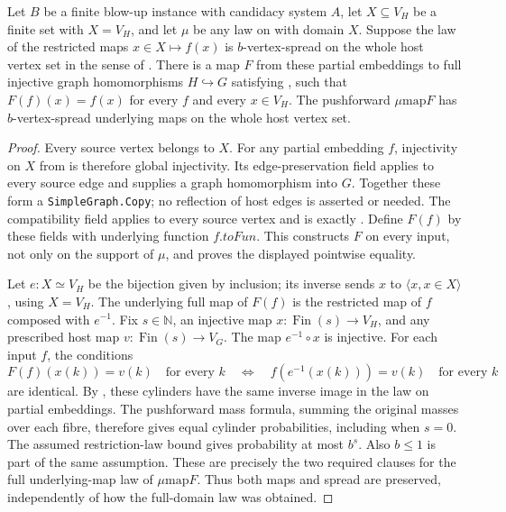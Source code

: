 \begin{lemma}
Let $B$ be a finite blow-up instance with candidacy system $A$, let
$X\subseteq V_H$ be a finite set with $X=V_H$, and let $\mu$ be any law on
 with domain $X$. Suppose the law of
the restricted maps $x\in X\mapsto f(x)$ is $b$-vertex-spread on the whole
host vertex set in the sense of .
There is a map $F$ from these partial embeddings to full injective graph
homomorphisms $H\hookrightarrow G$ satisfying ,
such that $F(f)(x)=f(x)$ for every $f$ and every $x\in V_H$.
The pushforward $\mu\mathbin{\mathrm{map}}F$ has $b$-vertex-spread
underlying maps on the whole host vertex set.
\end{lemma}
\begin{proof}
Every source vertex belongs to $X$. For any partial embedding $f$,
injectivity on $X$ from  is therefore
global injectivity. Its edge-preservation field applies to every source
edge and supplies a graph homomorphism into $G$. Together these form a
\texttt{SimpleGraph.Copy}; no reflection of host edges is asserted or
needed. The compatibility field applies to every source vertex and is
exactly . Define $F(f)$ by these fields
with underlying function $f.toFun$. This constructs $F$ on every input,
not only on the support of $\mu$, and proves the displayed pointwise equality.

Let $e:X\simeq V_H$ be the bijection given by inclusion; its inverse
sends $x$ to $\langle x,x\in X\rangle$, using $X=V_H$.
The underlying full map of $F(f)$ is the restricted map of $f$ composed
with $e^{-1}$. Fix $s\in\mathbb N$, an injective map
$x:\operatorname{Fin}(s)\to V_H$, and any prescribed host map
$v:\operatorname{Fin}(s)\to V_G$. The map $e^{-1}\circ x$ is injective.
For each input $f$, the conditions
\[
 F(f)(x(k))=v(k)\quad\text{for every }k
 \quad\Longleftrightarrow\quad
 f(e^{-1}(x(k)))=v(k)\quad\text{for every }k
\]
are identical. By , these cylinders have the
same inverse image in the law on partial embeddings. The pushforward
mass formula, summing the original masses over each fibre, therefore
gives equal cylinder probabilities, including when $s=0$.
The assumed restriction-law bound gives probability at most $b^s$.
Also $b\leq1$ is part of the same  assumption.
These are precisely the two required clauses for the full underlying-map
law of $\mu\mathbin{\mathrm{map}}F$. Thus both maps and spread are
preserved, independently of how the full-domain law was obtained.
\end{proof}
